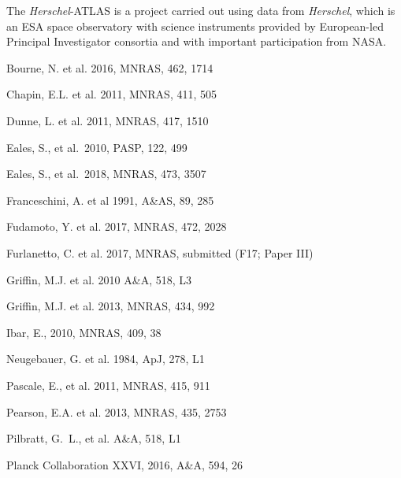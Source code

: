 \documentclass[a4paper,fleqn,usenatbib, twocolumn]{aastex61}
\def\pasp{PASP}
\begin{document}
The {\it Herschel}-ATLAS is a project carried out using data from {\it
  Herschel}, which is an ESA space observatory with science
instruments provided by European-led Principal Investigator consortia
and with important participation from NASA.

\begin{thebibliography}{}


 Bourne, N. et al. 2016, MNRAS, 462, 1714

 Chapin, E.L. et al. 2011, MNRAS, 411, 505

 Dunne, L. et al. 2011, MNRAS, 417, 1510

 Eales, S., et al.\ 2010,  \pasp, 122, 499 

 Eales, S., et al.\ 2018, MNRAS, 473, 3507

 Franceschini,
  A. et al 1991, A\&AS, 89, 285
  
 Fudamoto, Y. et al. 2017,
MNRAS, 472, 2028

 Furlanetto, C. et al. 2017,
MNRAS, submitted (F17; Paper III)

 Griffin, M.J. et al. 2010 A\&A, 518, L3

 Griffin, M.J. et al. 2013,
MNRAS, 434, 992

 Ibar, E., 2010, MNRAS, 409, 38

 Neugebauer, G. et al. 1984,
ApJ, 278, L1

 Pascale, E., et al. 2011, MNRAS, 415, 911 

 Pearson, E.A. et al. 2013, MNRAS, 435,
2753

 Pilbratt, G.~L., et al. A\&A, 518, L1

 Planck
  Collaboration XXVI, 2016, A\&A, 594, 26
  

\end{thebibliography}
\end{document}

